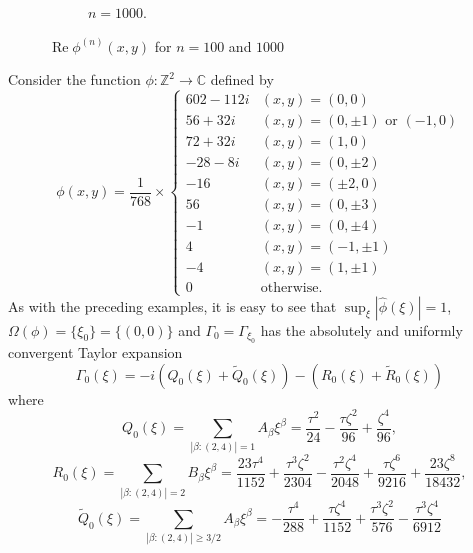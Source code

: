 \documentclass[11pt, letter]{book}
\newenvironment{example}
  {\pushQED{\qed}\renewcommand{\qedsymbol}{$\triangle$}\examplex}
  {\popQED\endexamplex}
\renewcommand\Re{\operatorname{Re}}%
\newcommand{\f}[2]{\frac{#1}{#2}}
\begin{document}
\begin{example}
\begin{figure}[!htb]
\begin{subfigure}{0.49\textwidth}
    \caption{$n = 1000$.}
    \label{fig:Conv_Pwr_00b}
    \end{subfigure}
    \caption{$\Re\phi^{(n)}(x,y)$ for $n=100$ and $1000$}
    \label{fig:Conv_Pwr_00}
\end{figure}
\end{example}

\begin{example}\normalfont
Consider the function $\phi : \mathbb{Z}^2 \to \mathbb{C}$ defined by 
\begin{equation*}
    \phi(x,y) = 
    \f{1}{768}\times
    \begin{cases}
    602 - 112i &(x,y) = (0,0)\\
    56 + 32i   &(x,y) = (0,\pm 1)\mbox{ or }(-1,0)\\
    72 + 32i   &(x,y) = (1,0)\\
    -28 - 8i   &(x,y) = (0,\pm 2)\\
    -16        &(x,y) = (\pm 2,0)\\
    56         &(x,y) = (0,\pm 3)\\
    -1         &(x,y) = (0,\pm 4)\\
    4          &(x,y) = (-1,\pm 1)\\
    -4         &(x,y) = (1,\pm 1)\\
    0          &\text{otherwise}.
    \end{cases}
\end{equation*}
As with the preceding examples, it is easy to see that $\sup_{\xi}|\widehat{\phi}(\xi)|=1$, $\Omega(\phi)=\{\xi_0\}=\{(0,0)\}$ and $\Gamma_{0}=\Gamma_{\xi_0}$ has the absolutely and uniformly convergent Taylor expansion
\begin{equation*}
    \Gamma_{0}(\xi)=-i\left(Q_0(\xi)+\widetilde{Q}_0(\xi)\right)-\left(R_0(\xi)+\widetilde{R}_0(\xi)\right)
\end{equation*}
where
\begin{equation*}
    Q_0(\xi)=\sum_{|\beta:(2,4)|=1}A_\beta \xi^\beta=\frac{\tau^2}{24}-\frac{\tau\zeta^2}{96} +\frac{ \zeta^4}{96},
\end{equation*}
\begin{equation*}
    R_0(\xi)=\sum_{|\beta:(2,4)|=2}B_\beta \xi^\beta=\frac{23\tau^4}{1152}  + \frac{\tau^3\zeta^2}{2304}  - \frac{\tau^2\zeta^4}{2048} + \f{\tau\zeta^6}{9216}+ \frac{23\zeta^8}{18432},
\end{equation*}
\begin{equation*}
    \widetilde{Q}_0(\xi)=\sum_{|\beta:(2,4)|\geq 3/2}A_\beta \xi^\beta=- \frac{\tau^4}{288}+\frac{\tau\zeta^4}{1152} +\frac{\tau^3\zeta^2}{576}  -\frac{\tau^3\zeta^4}{6912} %

\end{equation*}
\end{example}
\end{document}
